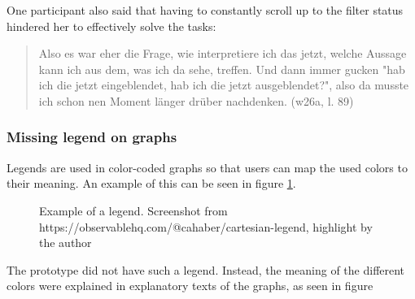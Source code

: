 One participant also said that having to constantly scroll up to the filter status hindered her to effectively solve the tasks:

\begin{quote}
    Also es war eher die Frage, wie interpretiere ich das jetzt, welche Aussage kann ich aus dem, was ich da sehe, treffen. Und dann immer gucken "hab ich die jetzt eingeblendet, hab ich die jetzt ausgeblendet?", also da musste ich schon nen Moment länger drüber nachdenken. (w26a, l. 89)
\end{quote}

\subsubsection*{Missing legend on graphs}
Legends are used in color-coded graphs so that users can map the used colors to their meaning. An example of this can be seen in figure \ref{fig:legend_example}.

\begin{figure}[h!tb]
    \caption{Example of a legend. Screenshot from https://observablehq.com/@cahaber/cartesian-legend, highlight by the author}
    \label{fig:legend_example}
\end{figure}

The prototype did not have such a legend. Instead, the meaning of the different colors were explained in explanatory texts of the graphs, as seen in figure %


